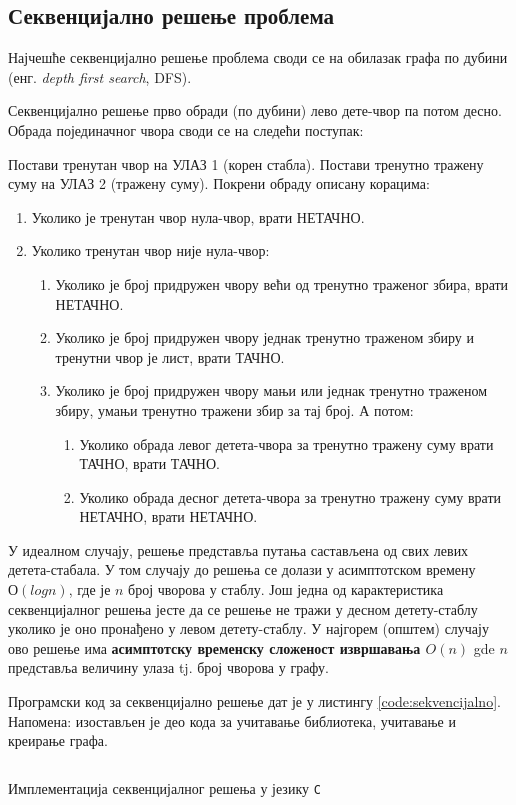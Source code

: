 \subsection{Секвенцијално решење проблема}

Најчешће секвенцијално решење проблема своди се на обилазак графа по дубини (енг. \textit{depth first search}, DFS).

Секвенцијално решење прво обради (по дубини) лево дете-чвор па потом десно.
Обрада појединачног чвора своди се на следећи поступак:

Постави тренутан чвор на УЛАЗ 1 (корен стабла). Постави тренутно тражену суму на УЛАЗ 2 (тражену суму).
Покрени обраду описану корацима:

\begin{enumerate}
    \item Уколико је тренутан чвор нула-чвор, врати НЕТАЧНО.
    \item Уколико тренутан чвор није нула-чвор:
    \begin{enumerate}
        \item Уколико је број придружен чвору већи од тренутно траженог збира, врати НЕТАЧНО.
        \item Уколико је број придружен чвору једнак тренутно траженом збиру и тренутни чвор је лист, врати ТАЧНО.
        \item Уколико је број придружен чвору мањи или једнак тренутно траженом збиру, умањи тренутно тражени збир за тај број. А потом:
        \begin{enumerate}
            \item Уколико обрада левог детета-чвора за тренутно тражену суму врати ТАЧНО, врати ТАЧНО.
            \item Уколико обрада десног детета-чвора за тренутно тражену суму врати НЕТАЧНО, врати НЕТАЧНО.
        \end{enumerate}
    \end{enumerate}
\end{enumerate}

У идеалном случају, решење представља путања састављена од свих левих детета-стабала. У том случају до решења се долази у асимптотском времену $О(log n)$,
где је $n$ број чворова у стаблу. Још једна од карактеристика секвенцијалног решења јесте да се решење не тражи у десном детету-стаблу уколико је оно
пронађено у левом детету-стаблу.
У најгорем (општем) случају ово решење има \textbf{асимптотску временску сложеност извршавања $O(n)$} gde $n$ представља величину улаза tj. број чворова у графу.

Програмски код за секвенцијално решење дат је у листингу \ref{code:sekvencijalno}. Напомена: изостављен је део кода за учитавање библиотека, учитавање и креирање графа.

\begin{listing}
\inputminted{c}{kodovi/basic.c}
\caption{Имплементација секвенцијалног решења у језику \texttt{C}}
\label{code:sekvencijalno}
\end{listing}

\pagebreak
